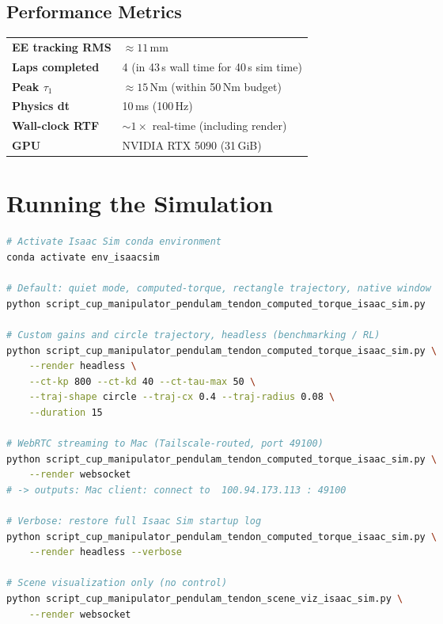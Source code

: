 \documentclass[11pt,a4paper]{article}
\begin{document}
\subsection{Performance Metrics}

\begin{resultbox}
\begin{tabular}{ll}
    \textbf{EE tracking RMS} & $\approx 11$\,mm \\
    \textbf{Laps completed} & 4 (in 43\,s wall time for 40\,s sim time) \\
    \textbf{Peak $\tau_1$} & $\approx 15$\,Nm (within 50\,Nm budget) \\
    \textbf{Physics dt} & 10\,ms (100\,Hz) \\
    \textbf{Wall-clock RTF} & $\sim 1\times$ real-time (including render) \\
    \textbf{GPU} & NVIDIA RTX 5090 (31\,GiB) \\
\end{tabular}
\end{resultbox}


\section{Running the Simulation}
\label{sec:running}

\begin{lstlisting}[language=bash, backgroundcolor=\color{lightgray}, frame=single, rulecolor=\color{gray}]
# Activate Isaac Sim conda environment
conda activate env_isaacsim

# Default: quiet mode, computed-torque, rectangle trajectory, native window
python script_cup_manipulator_pendulam_tendon_computed_torque_isaac_sim.py

# Custom gains and circle trajectory, headless (benchmarking / RL)
python script_cup_manipulator_pendulam_tendon_computed_torque_isaac_sim.py \
    --render headless \
    --ct-kp 800 --ct-kd 40 --ct-tau-max 50 \
    --traj-shape circle --traj-cx 0.4 --traj-radius 0.08 \
    --duration 15

# WebRTC streaming to Mac (Tailscale-routed, port 49100)
python script_cup_manipulator_pendulam_tendon_computed_torque_isaac_sim.py \
    --render websocket
# -> outputs: Mac client: connect to  100.94.173.113 : 49100

# Verbose: restore full Isaac Sim startup log
python script_cup_manipulator_pendulam_tendon_computed_torque_isaac_sim.py \
    --render headless --verbose

# Scene visualization only (no control)
python script_cup_manipulator_pendulam_tendon_scene_viz_isaac_sim.py \
    --render websocket
\end{lstlisting}
\end{document}
